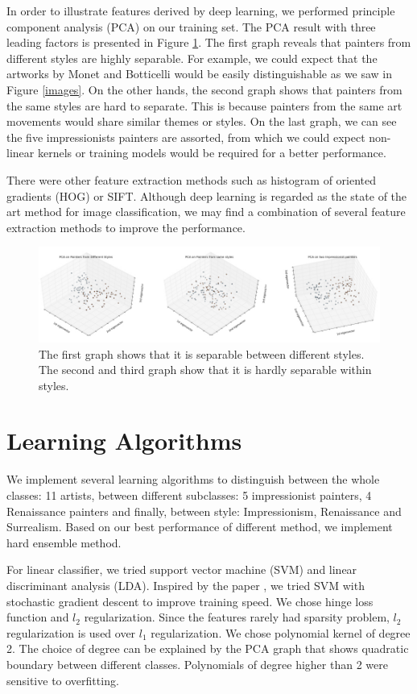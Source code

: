 \documentclass[11pt,a4paper]{article}
\begin{document}
In order to illustrate features derived by deep learning, we performed principle component analysis (PCA) on our training set. The PCA result with three leading factors is presented in Figure \ref{pca_eig}. The first graph reveals that painters from different styles are highly separable. For example, we could expect that the artworks by Monet and Botticelli would be easily distinguishable as we saw in Figure \ref{images}. On the other hands, the second graph shows that painters from the same styles are hard to separate. This is because painters from the same art movements would share similar themes or styles. On the last graph, we can see the five impressionists painters are assorted, from which we could expect non-linear kernels or training models would be required for a better performance.

There were other feature extraction methods such as histogram of oriented gradients (HOG) or SIFT. Although deep learning is regarded as the state of the art method for image classification, we may find a combination of several feature extraction methods to improve the performance.

\begin{figure}
    \centering
        \includegraphics[width = 6in]{pca_eig.png}
        \caption{The first graph shows that it is separable between different styles. The second and third graph show that it is hardly separable within styles.}
        \label{pca_eig}
\end{figure}


\section{Learning Algorithms}
We implement several learning algorithms to distinguish between the whole classes: 11 artists, between different subclasses: 5 impressionist painters, 4 Renaissance painters and finally, between style: Impressionism, Renaissance and Surrealism. Based on our best performance of different method, we implement hard ensemble method. 

For linear classifier, we tried support vector machine (SVM) and linear discriminant analysis (LDA). Inspired by the paper \cite{DBLP:journals/corr/KarayevHWAD13}, we tried SVM with stochastic gradient descent to improve training speed. We chose hinge loss function and $l_2$ regularization. Since the features rarely had sparsity problem, $l_2$ regularization is used over $l_1$ regularization. We chose polynomial kernel of degree 2. The choice of degree can be explained by the PCA graph that shows quadratic boundary between different classes. Polynomials of degree higher than 2 were sensitive to overfitting.
\end{document}
